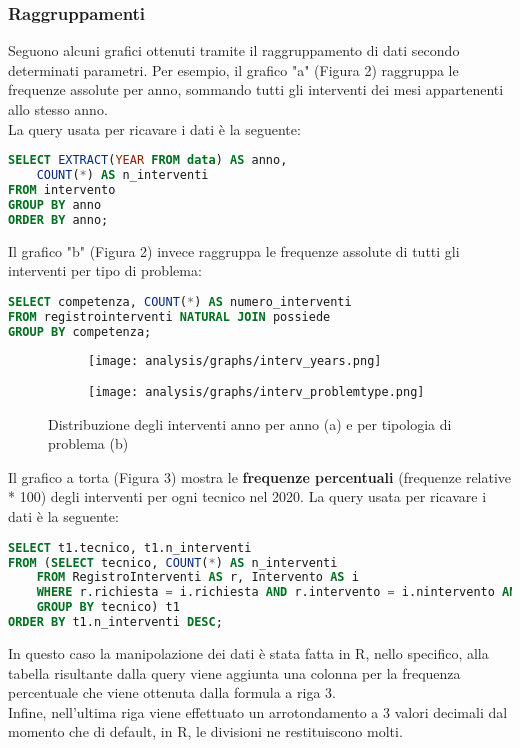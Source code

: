 \documentclass{article}
\begin{document}
\subsubsection{Raggruppamenti}

Seguono alcuni grafici ottenuti tramite il raggruppamento di dati secondo determinati parametri.
Per esempio, il grafico "a" (Figura 2) raggruppa le frequenze assolute per anno, sommando tutti gli interventi dei mesi appartenenti allo stesso anno.\\
La query usata per ricavare i dati è la seguente:
\begin{lstlisting}[language=SQL]
SELECT EXTRACT(YEAR FROM data) AS anno, 
    COUNT(*) AS n_interventi
FROM intervento 
GROUP BY anno
ORDER BY anno;
\end{lstlisting}
Il grafico "b" (Figura 2) invece raggruppa le frequenze assolute di tutti gli interventi per tipo di problema:
\begin{lstlisting}[language=SQL]
SELECT competenza, COUNT(*) AS numero_interventi 
FROM registrointerventi NATURAL JOIN possiede
GROUP BY competenza;
\end{lstlisting}
\begin{figure}[H]
    \begin{subfigure}{0.49\textwidth}
        \texttt{[image: analysis/graphs/interv\_years.png]}
        \label{fig:data_analysis2}
    \end{subfigure}
    \begin{subfigure}{0.49\textwidth}
        \texttt{[image: analysis/graphs/interv\_problemtype.png]}
        \label{fig:data_analysis3}
    \end{subfigure}
    \caption{Distribuzione degli interventi anno per anno (a) e per tipologia di problema (b)}
    \label{fig:combined}
\end{figure}
Il grafico a torta (Figura 3) mostra le \textbf{frequenze percentuali} (frequenze relative * 100) degli interventi per ogni tecnico nel 2020. La query usata per ricavare i dati è la seguente:
\begin{lstlisting}[language=SQL]
SELECT t1.tecnico, t1.n_interventi
FROM (SELECT tecnico, COUNT(*) AS n_interventi
    FROM RegistroInterventi AS r, Intervento AS i 
    WHERE r.richiesta = i.richiesta AND r.intervento = i.nintervento AND i.data > '2020-1-1' AND i.data < '2021-1-1'
    GROUP BY tecnico) t1
ORDER BY t1.n_interventi DESC;
\end{lstlisting}
\newpage
In questo caso la manipolazione dei dati è stata fatta in R, nello specifico, alla tabella risultante dalla query viene aggiunta una colonna per la frequenza percentuale che viene ottenuta dalla formula a riga 3. \\ Infine, nell'ultima riga viene effettuato un arrotondamento a 3 valori decimali dal momento che di default, in R, le divisioni ne restituiscono molti.
\end{document}
